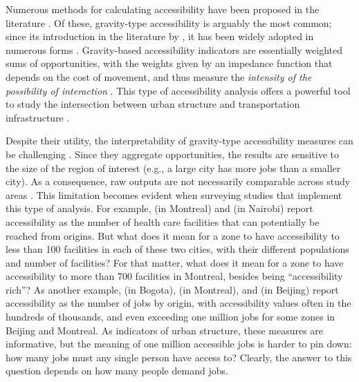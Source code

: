 \documentclass[]{elsarticle} %
\begin{document}
Numerous methods for calculating accessibility have been proposed in the
literature \citep{geurs2004}. Of these, gravity-type accessibility is
arguably the most common; since its introduction in the literature by
\citet{hansen1959}, it has been widely adopted in numerous forms
\citep{cervero_transportation_2002, paez2004network, geurs2004, levinson_accessibility_1998, Arranz2019measuring}.
Gravity-based accessibility indicators are essentially weighted sums of
opportunities, with the weights given by an impedance function that
depends on the cost of movement, and thus measure the \emph{intensity of
the possibility of interaction} \citep{hansen1959}. This type of
accessibility analysis offers a powerful tool to study the intersection
between urban structure and transportation infrastructure
\citep{handy_measuring_1997}.

Despite their utility, the interpretability of gravity-type
accessibility measures can be challenging \citep{geurs2004, miller2018}.
Since they aggregate opportunities, the results are sensitive to the
size of the region of interest (e.g., a large city has more jobs than a
smaller city). As a consequence, raw outputs are not necessarily
comparable across study areas \citep{allen2019}. This limitation becomes
evident when surveying studies that implement this type of analysis. For
example, \citet{paez_healthcare_2010} (in Montreal) and
\citet{campbell_2019_accessibility} (in Nairobi) report accessibility as
the number of health care facilities that can potentially be reached
from origins. But what does it mean for a zone to have accessibility to
less than 100 facilities in each of these two cities, with their
different populations and number of facilities? For that matter, what
does it mean for a zone to have accessibility to more than 700
facilities in Montreal, besides being ``accessibility rich''? As another
example, \citet{bocarejo_s_transport_2012} (in Bogota),
\citet{elgeneidy_cost_2016} (in Montreal), and
\citet{jiang_2016_accessibility} (in Beijing) report accessibility as
the number of jobs by origin, with accessibility values often in the
hundreds of thousands, and even exceeding one million jobs for some
zones in Beijing and Montreal. As indicators of urban structure, these
measures are informative, but the meaning of one million accessible jobs
is harder to pin down: how many jobs must any single person have access
to? Clearly, the answer to this question depends on how many people
demand jobs.
\end{document}
